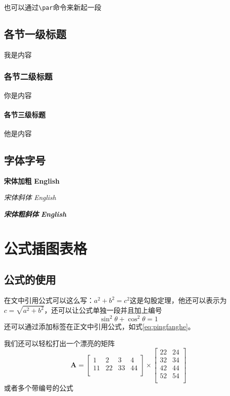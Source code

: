 \documentclass[]{WHUBachelor}
\begin{document}
  也可以通过\verb|\par|命令来新起一段
  \section{各节一级标题}
  我是内容
  \subsection{各节二级标题}
  你是内容
  \subsubsection{各节三级标题}
  他是内容
  \section{字体字号}
  {\songti \bfseries 宋体加粗} {\textbf{English}}

  {\songti \itshape 宋体斜体} {\textit{English}}

  {\songti \bfseries \itshape 宋体粗斜体} {\textbf{\textit{English}}}
  
  \chapter{公式插图表格}
  \section{公式的使用}
  在文中引用公式可以这么写：$a^2+b^2=c^2$这是勾股定理，他还可以表示为$c=\sqrt{a^2+b^2}$，还可以让公式单独一段并且加上编号
  \begin{equation}
  \sin^2{\theta}+\cos^2{\theta}=1 \label{eq:pingfanghe}
  \end{equation}
  还可以通过添加标签在正文中引用公式，如式\eqref{eq:pingfanghe}。

  我们还可以轻松打出一个漂亮的矩阵
  \begin{equation}
    \mathbf{A}=
    \left[\begin{matrix}
      1&2&3&4\\
      11&22&33&44\\
    \end{matrix}\right] \times
    \left[\begin{matrix}
      22&24\\
      32&34\\
      42&44\\
      52&54\\
    \end{matrix}\right]
  \end{equation}
  或者多个带编号的公式
\end{document}
